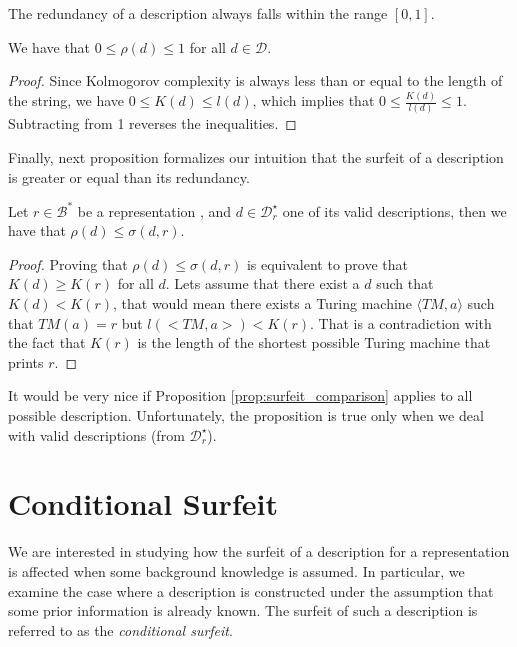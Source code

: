 The redundancy of a description always falls within the range $[0, 1]$.

\begin{proposition}
We have that $0 \leq \rho(d) \leq 1$ for all $d \in \mathcal{D}$.
\end{proposition}
\begin{proof}
Since Kolmogorov complexity is always less than or equal to the length of the string, we have $0 \leq K(d) \leq l(d)$, 
which implies that $0 \leq \frac{K(d)}{l(d)} \leq 1$. Subtracting from 1 reverses the inequalities.
\end{proof}

Finally, next proposition formalizes our intuition that the surfeit of a description is greater or equal than its redundancy.

\begin{proposition}
\label{prop:surfeit_comparison}
Let $r \in \mathcal{B}^\ast$ be a representation , and $d \in \mathcal{D}^\star_r$ one of its valid descriptions, then we have that $\rho(d) \leq \sigma(d, r)$.
\end{proposition}
\begin{proof}
Proving that $\rho(d) \leq \sigma(d, r)$ is equivalent to prove that $K(d) \geq K(r)$ for all $d$. Lets assume that there exist a $d$ such that $K(d) < K(r)$, that would mean there exists a Turing machine $\langle TM, a \rangle$ such that $TM(a)=r$ but $l(<TM, a>) < K(r)$. That is a contradiction with the fact that $K(r)$ is the length of the shortest possible Turing machine that prints $r$.
\end{proof}

It would be very nice if Proposition \ref{prop:surfeit_comparison} applies to all possible description. Unfortunately, the proposition is true only when we deal with valid descriptions (from $\mathcal{D}^\star_r$).

%
%

\section{Conditional Surfeit}

We are interested in studying how the surfeit of a description for a representation is affected when some background knowledge is assumed. In particular, we examine the case where a description is constructed under the assumption that some prior information is already known. The surfeit of such a description is referred to as the \emph{conditional surfeit}.

